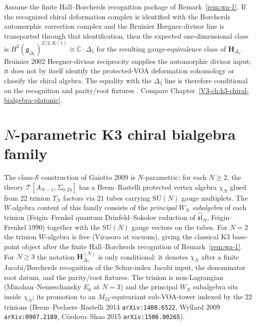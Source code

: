 \begin{remark}
\label{rem:wa-2}
Assume the finite Hall--Borcherds recognition package of
Remark~\ref{rem:wa-1}. If the recognized chiral deformation complex is
identified with the Borcherds automorphic correction complex and the
Bruinier Heegner-divisor line is transported through that identification,
then the expected one-dimensional class is
$H^2(\mathfrak g_{\Delta_5})^{\mathbb Z/2, K(1)} \cong \mathbb C\cdot\Delta_5$
for the resulting gauge-equivalence class of $\mathbf H_{\Delta_5}$.
Bruinier 2002 Heegner-divisor reciprocity supplies the automorphic
divisor input; it does not by itself identify the protected-VOA
deformation cohomology or classify the chiral algebra. The equality
with the $\Delta_5$ line is therefore conditional on the recognition
and parity/root fixtures
\cite{Bruinier2002,EtingofKazhdan2007PartV}. Compare
Chapter~\ref{V3-ch:k3-chiral-bialgebra-platonic}.
\end{remark}

\section{$N$-parametric K3 chiral bialgebra family}
\label{sec:wa-supplement-ii}

\begin{remark}
\label{rem:wa-N-extension}
The class-$\mathcal S$ construction of Gaiotto 2009 is
$N$-parametric: for each $N \ge 2$, the theory
$\mathcal T[A_{N-1}, \Sigma_{0,24}]$ has a Beem--Rastelli protected
vertex algebra $\chi_N$ glued from $22$
trinion $T_N$ factors via $21$ tubes carrying $\mathrm{SU}(N)$
gauge multiplets. The $W$-algebra content of this family consists
of the \emph{principal $W_N$ subalgebra} of each trinion (Feigin--Frenkel
quantum Drinfeld--Sokolov reduction of $\widehat{\mathfrak{sl}}_N$,
Feigin--Frenkel 1990) together with the $\mathrm{SU}(N)$ gauge
vectors on the tubes. For $N = 2$ the trinion $W$-algebra is free
(Virasoro at vacuum), giving the classical K3 base-point object after
the finite Hall--Borcherds recognition of Remark~\ref{rem:wa-1}. For
$N \ge 3$ the notation $\mathbf H^{(N)}_{\Delta_5}$ is only conditional:
it denotes $\chi_N$ after a finite Jacobi/Borcherds recognition of the
Schur-index Jacobi input, the denominator root datum, and the
parity/root fixtures. The
trinion is non-Lagrangian (Minahan--Nemeschansky $E_6$ at $N = 3$)
and the principal $W_N$ subalgebra sits inside
$\chi_N$; its promotion to an $M_{24}$-equivariant
sub-VOA-tower indexed by the $22$ trinions
(Beem--Peelaers--Rastelli 2014 \texttt{arXiv:1408.6522},
Wyllard 2009 \texttt{arXiv:0907.2189}, C\'ordova--Shao 2015
\texttt{arXiv:1506.00265}).
\end{remark}

